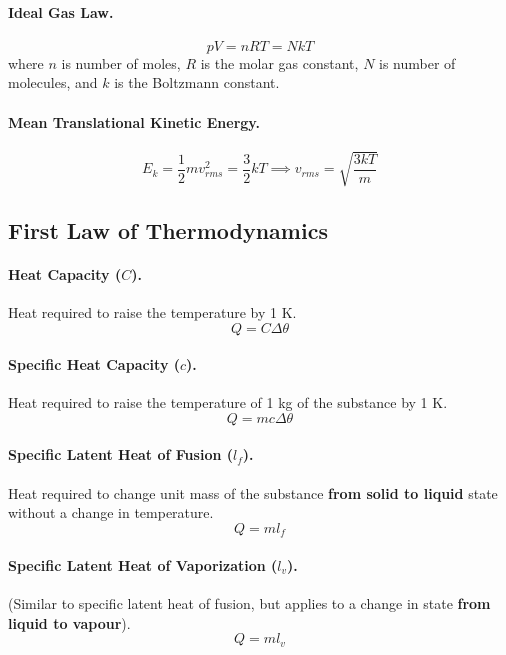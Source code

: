 \documentclass{article}
\begin{document}
\paragraph{Ideal Gas Law.} \begin{equation} pV = nRT = NkT \end{equation} where
  $n$ is number of moles, $R$ is the molar gas constant, $N$ is number of
  molecules, and $k$ is the Boltzmann constant.

\paragraph{Mean Translational Kinetic Energy.} \begin{equation} E_k =
\frac{1}{2}mv_{rms}^2 = \frac{3}{2}kT \implies v_{rms} = \sqrt{\frac{3kT}{m}}
\end{equation}

\subsection{First Law of Thermodynamics}

\paragraph{Heat Capacity ($C$).} Heat required to raise the temperature by 1 K.
\begin{equation} Q = C\Delta\theta \end{equation}

\paragraph{Specific Heat Capacity ($c$).} Heat required to raise the temperature
of 1 kg of the substance by 1 K. \begin{equation} Q = mc\Delta\theta
\end{equation}

\paragraph{Specific Latent Heat of Fusion ($l_f$).} Heat required to change unit
mass of the substance \textbf{from solid to liquid} state without a change in
temperature. \begin{equation} Q = ml_f \end{equation}

\paragraph{Specific Latent Heat of Vaporization ($l_v$).} (Similar to specific
latent heat of fusion, but applies to a change in state \textbf{from liquid to
vapour}). \begin{equation} Q = ml_v \end{equation}
\end{document}
